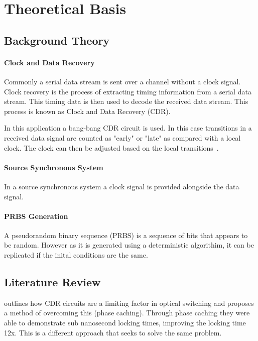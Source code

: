 \chapter{Theoretical Basis}

\section{Background Theory}%
\label{sec:background_theory}

\subsubsection{Clock and Data Recovery}%
\label{ssub:clock_and_data_recovery}
Commonly a serial data stream is sent over a channel without a clock signal.
Clock recovery is the process of extracting timing information from a serial
data stream. This timing data is then used to decode the received data stream.
This process is known as Clock and Data Recovery (CDR).

In this application a bang-bang CDR circuit is used. 
In this case transitions in a received data signal are counted as "early" or
"late" as compared with a local clock. The clock can then be adjusted based on
the local transitions~\cite{alexander1975clock}.

\subsubsection{Source Synchronous System}%
\label{ssub:source_synchronous_system}
In a source synchronous system a clock signal is provided alongside the data
signal. 

\subsubsection{PRBS Generation}%
\label{ssub:prbs_generation}
A pseudorandom binary sequence (PRBS) is a sequence of bits that appears to be
random. However as it is generated using a deterministic algorithim, it can be
replicated if the inital conditions are the same.

\section{Literature Review}%
\label{sec:literature_review}

\noindent \cite{kari_phase} outlines how CDR circuits are a limiting factor in
optical switching and proposes a method of overcoming this (phase caching).
Through phase caching they were able to demonstrate sub nanosecond locking
times, improving the locking time 12x. This is a different approach that seeks
to solve the same problem.

